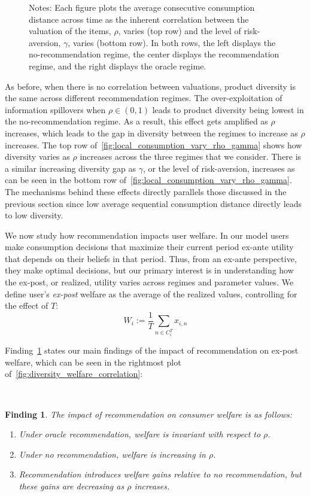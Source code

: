 \documentclass[manuscript]{acmart}
\newtheorem{finding}{Finding}
\begin{document}
\begin{figure}[t]
\begin{subfigure}{.3\linewidth}
\end{subfigure}%
\caption*{\scriptsize Notes: Each figure plots the average consecutive consumption distance across time as the inherent correlation between the valuation of the items, $\rho$, varies (top row) and the level of risk-aversion, $\gamma$, varies (bottom row). In both rows, the left displays the no-recommendation regime, the center displays the recommendation regime, and the right displays the oracle regime.}
\label{fig:local_consumption_vary_rho_gamma}
\end{figure}
\addtocounter{figure}{-1}
As before, when there is no correlation between valuations, product diversity is the same across different recommendation regimes. The over-exploitation of information spillovers when $\rho \in (0,1)$ leads to product diversity being lowest in the no-recommendation regime. As a result, this effect gets amplified as $\rho$ increases, which leads to the gap in diversity between the regimes to increase as $\rho$ increases. The top row of~\autoref{fig:local_consumption_vary_rho_gamma} shows how diversity varies as $\rho$ increases across the three regimes that we consider. There is a similar increasing diversity gap as $\gamma$, or the level of risk-aversion, increases as can be seen in the bottom row of~\autoref{fig:local_consumption_vary_rho_gamma}. The mechanisms behind these effects directly parallels those discussed in the previous section since low average sequential consumption distance directly leads to low diversity.
\par 

We now study how recommendation impacts user welfare. In our model users make consumption decisions that maximize their current period ex-ante utility that depends on their beliefs in that period. Thus, from an ex-ante perspective, they make optimal decisions, but our primary interest is in understanding how the ex-post, or realized, utility varies across regimes and parameter values. We define user's \textit{ex-post} welfare as the average of the realized values, controlling for the effect of $T$:
$$W_i:= \frac{1}{T}\sum_{n \in C_i^T} x_{i,n}$$

\noindent Finding~\ref{finding_welfare_gap} states our main findings of the impact of recommendation on ex-post welfare, which can be seen in the rightmost plot of~\autoref{fig:diversity_welfare_correlation}:

~\par
\begin{finding}\label{finding_welfare_gap}
The impact of recommendation on consumer welfare is as follows:
\begin{enumerate}
\item Under oracle recommendation, welfare is invariant with respect to $\rho$.
\item Under no recommendation, welfare is increasing in $\rho$.
\item Recommendation introduces welfare gains relative to no recommendation, but these gains are decreasing as $\rho$ increases.
\end{enumerate}
\end{finding}
\par 
\end{document}
